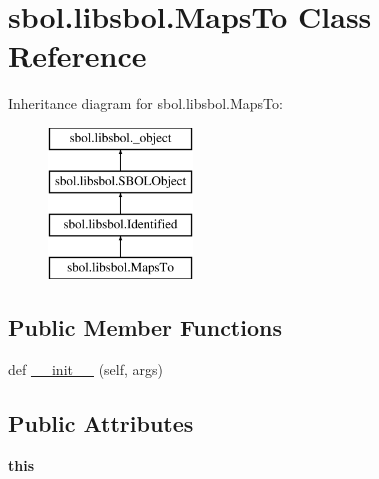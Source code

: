 \hypertarget{classsbol_1_1libsbol_1_1_maps_to}{}\section{sbol.\+libsbol.\+Maps\+To Class Reference}
\label{classsbol_1_1libsbol_1_1_maps_to}
Inheritance diagram for sbol.\+libsbol.\+Maps\+To\+:\begin{figure}[H]
\begin{center}
\leavevmode
\includegraphics[height=4.000000cm]{classsbol_1_1libsbol_1_1_maps_to}
\end{center}
\end{figure}
\subsection*{Public Member Functions}
\begin{DoxyCompactItemize}
\item 
def \hyperlink{classsbol_1_1libsbol_1_1_maps_to_a86cb474078deafb4da5ee28ce43c5a10}{\+\_\+\+\_\+init\+\_\+\+\_\+} (self, args)
\end{DoxyCompactItemize}
\subsection*{Public Attributes}
\begin{DoxyCompactItemize}
\item 
{\bfseries this}\hypertarget{classsbol_1_1libsbol_1_1_maps_to_a1669f9e878853c6cd190a58a443dc35d}{}\label{classsbol_1_1libsbol_1_1_maps_to_a1669f9e878853c6cd190a58a443dc35d}

\end{DoxyCompactItemize}
